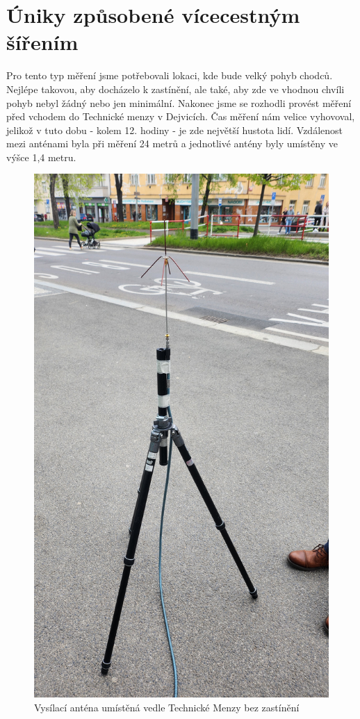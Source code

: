 \chapter{Úniky způsobené vícecestným šířením}
Pro tento typ měření jsme potřebovali lokaci, kde bude velký pohyb chodců. Nejlépe takovou, aby docházelo k zastínění, ale také, aby zde ve vhodnou chvíli pohyb nebyl žádný nebo jen minimální. Nakonec jsme se rozhodli provést měření před vchodem do Technické menzy v Dejvicích. Čas měření nám velice vyhovoval, jelikož v tuto dobu - kolem 12. hodiny - je zde největší hustota lidí. Vzdálenost mezi anténami byla při měření 24 metrů a jednotlivé antény byly umístěny ve výšce 1,4 metru.

\begin{figure}[h!]
    \centering
    \includegraphics[angle=270,scale=0.08]{img/antenna_uniky_menza.jpg}
    \caption{Vysílací anténa umístěná vedle Technické Menzy bez zastínění}
    \label{fig:my_label}
\end{figure}

